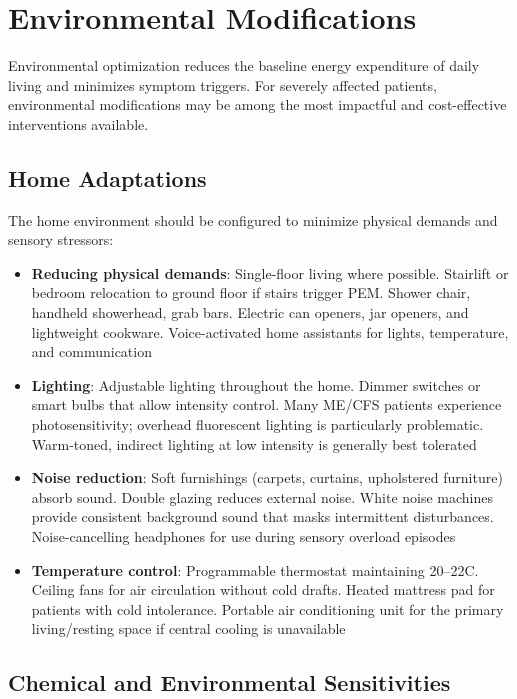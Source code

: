 \section{Environmental Modifications}
\label{sec:environmental}

Environmental optimization reduces the baseline energy expenditure of daily living and minimizes symptom triggers. For severely affected patients, environmental modifications may be among the most impactful and cost-effective interventions available.

\subsection{Home Adaptations}

The home environment should be configured to minimize physical demands and sensory stressors:

\begin{itemize}
    \item \textbf{Reducing physical demands}: Single-floor living where possible. Stairlift or bedroom relocation to ground floor if stairs trigger PEM. Shower chair, handheld showerhead, grab bars. Electric can openers, jar openers, and lightweight cookware. Voice-activated home assistants for lights, temperature, and communication
    \item \textbf{Lighting}: Adjustable lighting throughout the home. Dimmer switches or smart bulbs that allow intensity control. Many ME/CFS patients experience photosensitivity; overhead fluorescent lighting is particularly problematic. Warm-toned, indirect lighting at low intensity is generally best tolerated
    \item \textbf{Noise reduction}: Soft furnishings (carpets, curtains, upholstered furniture) absorb sound. Double glazing reduces external noise. White noise machines provide consistent background sound that masks intermittent disturbances. Noise-cancelling headphones for use during sensory overload episodes
    \item \textbf{Temperature control}: Programmable thermostat maintaining 20--22\textdegree C. Ceiling fans for air circulation without cold drafts. Heated mattress pad for patients with cold intolerance. Portable air conditioning unit for the primary living/resting space if central cooling is unavailable
\end{itemize}

\subsection{Chemical and Environmental Sensitivities}

